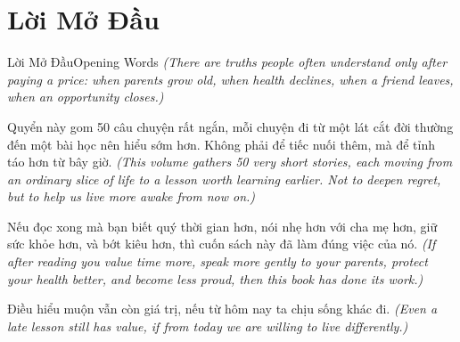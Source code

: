 \chapter*{Lời Mở Đầu}

\begin{truyen}{Lời Mở Đầu}{Opening Words}
\textit{(There are truths people often understand only after paying a price: when parents grow old, when health declines, when a friend leaves, when an opportunity closes.)}

Quyển này gom 50 câu chuyện rất ngắn, mỗi chuyện đi từ một lát cắt đời thường đến một bài học nên hiểu sớm hơn. Không phải để tiếc nuối thêm, mà để tỉnh táo hơn từ bây giờ.
\textit{(This volume gathers 50 very short stories, each moving from an ordinary slice of life to a lesson worth learning earlier. Not to deepen regret, but to help us live more awake from now on.)}

Nếu đọc xong mà bạn biết quý thời gian hơn, nói nhẹ hơn với cha mẹ hơn, giữ sức khỏe hơn, và bớt kiêu hơn, thì cuốn sách này đã làm đúng việc của nó.
\textit{(If after reading you value time more, speak more gently to your parents, protect your health better, and become less proud, then this book has done its work.)}
\end{truyen}

\begin{baihoc}
Điều hiểu muộn vẫn còn giá trị, nếu từ hôm nay ta chịu sống khác đi.
\textit{(Even a late lesson still has value, if from today we are willing to live differently.)}
\end{baihoc}
\ngancach